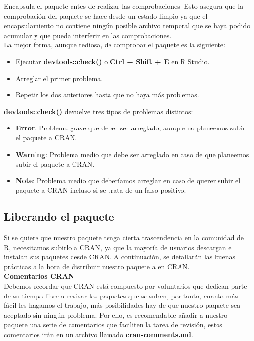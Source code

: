 Encapsula el paquete antes de realizar las comprobaciones. Esto asegura que la
comprobaci\'on del paquete se hace desde un estado limpio ya que el encapsulamiento no
contiene ning\'un posible archivo temporal que se haya podido acumular y que pueda interferir
en las comprobaciones.\\

La mejor forma, aunque tediosa, de comprobar el paquete es la siguiente:

\begin{itemize}
    \item Ejecutar \textbf{devtools::check()} o \textbf{Ctrl + Shift + E} en R Studio.
    \item Arreglar el primer problema.
    \item Repetir los dos anteriores hasta que no haya m\'as problemas.
\end{itemize}

\textbf{devtools::check()} devuelve tres tipos de problemas distintos:

\begin{itemize}
    \item \textbf{Error}: Problema grave que deber ser arreglado, aunque no planeemos subir el paquete a CRAN.
    \item \textbf{Warning}: Problema medio que debe ser arreglado en caso de que planeemos subir el paquete a CRAN.
    \item \textbf{Note}: Problema medio que deber\'iamos arreglar en caso de querer subir el paquete a CRAN incluso si se trata de un falso positivo.
\end{itemize}


\subsection{Liberando el paquete}

Si se quiere que nuestro paquete tenga cierta trascendencia en la comunidad de R,
necesitamos subirlo a CRAN, ya que la mayor\'ia de usuarios descargan e instalan sus
paquetes desde CRAN.
A continuaci\'on, se detallar\'an las buenas pr\'acticas a la hora de distribuir nuestro paquete a en CRAN. \\

\textbf{Comentarios CRAN}\\
Debemos recordar que CRAN est\'a compuesto por voluntarios que dedican parte de su tiempo
libre a revisar los paquetes que se suben, por tanto, cuanto m\'as f\'acil les hagamos el trabajo,
m\'as posibilidades hay de que nuestro paquete sea aceptado sin ning\'un problema.
Por ello, es recomendable a\~nadir a nuestro paquete una serie de comentarios que faciliten la
tarea de revisi\'on, estos comentarios ir\'an en un archivo llamado \textbf{cran-comments.md}.

